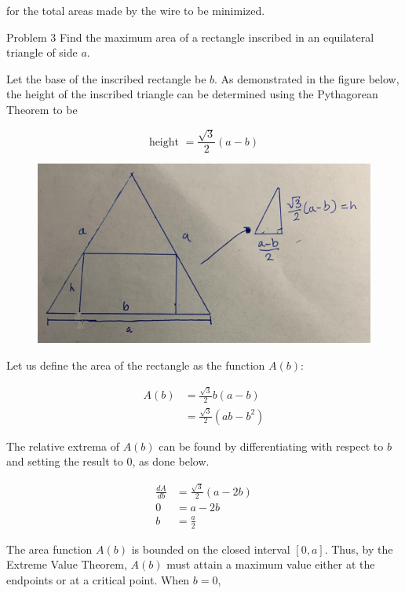 \documentclass{article}
\begin{document}
    for the total areas made by the wire to be minimized.

    \begin{tbhtheorem}{Problem 3}
        Find the maximum area of a rectangle inscribed in an equilateral triangle of side $a$.
    \end{tbhtheorem}

    Let the base of the inscribed rectangle be $b$. As demonstrated in the figure below, the height of the inscribed triangle can be determined using the Pythagorean Theorem to be

    \[
        \text{height } = \frac{\sqrt{3}}{2}(a-b)
    \]

    \begin{figure}[hbt!]
        \centering
        \includegraphics[scale=0.1]{3}
    \end{figure}

    Let us define the area of the rectangle as the function $A(b)$:

    \begin{align*}
        A(b)   &= \frac{\sqrt{3}}{2}b(a-b) \\
               &= \frac{\sqrt{3}}{2}(ab-b^2)
    \end{align*}

    The relative extrema of $A(b)$ can be found by differentiating with respect to $b$ and setting the result to 0, as done below.

    \begin{align*}
        \frac{dA}{db}   &= \frac{\sqrt{3}}{2}(a-2b) \\
        0               &= a-2b \\
        b               &= \frac{a}{2}
    \end{align*}

    The area function $A(b)$ is bounded on the closed interval $[0,a]$. Thus, by the Extreme Value Theorem, $A(b)$ must attain a maximum value either at the endpoints or at a critical point. When $b=0$,
\end{document}
